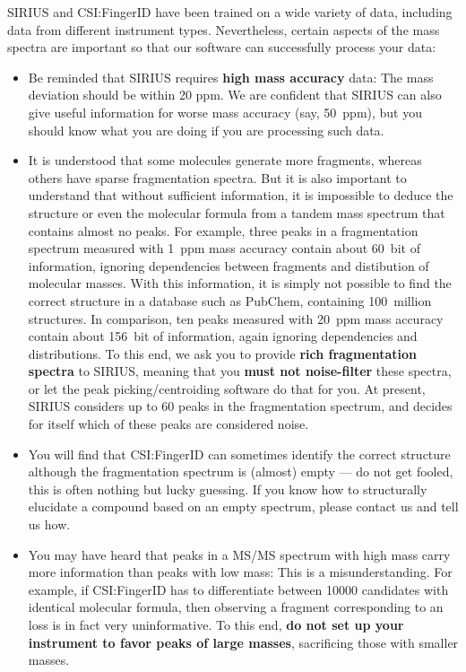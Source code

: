 \documentclass[letterpaper,10pt,openany,oneside]{sphinxmanual}
\begin{document}
SIRIUS and CSI:FingerID have been trained on a wide variety of data,
including data from different instrument types.  Nevertheless, certain
aspects of the mass spectra are important so that our software can
successfully process your data:
%
\begin{itemize}
\item Be reminded that SIRIUS requires \textbf{high mass accuracy} data:
  The mass deviation should be within 20 ppm.  We are confident that
  SIRIUS can also give useful information for worse mass accuracy (say,
  50~ppm), but you should know what you are doing if you are processing such
  data.

\item It is understood that some molecules generate more fragments, whereas
  others have sparse fragmentation spectra.  But it is also important to
  understand that without sufficient information, it is impossible to deduce
  the structure or even the molecular formula from a tandem mass spectrum
  that contains almost no peaks.  For example, three peaks in a fragmentation
  spectrum measured with 1~ppm mass accuracy contain about 60~bit of
  information, ignoring dependencies between fragments and distibution of
  molecular masses.  With this information, it is simply not possible to find
  the correct structure in a database such as PubChem, containing 100~million
  structures.  In comparison, ten peaks measured with 20~ppm mass accuracy
  contain about 156~bit of information, again ignoring dependencies and
  distributions.  To this end, we ask you to provide \textbf{rich
  fragmentation spectra} to SIRIUS, meaning that you \textbf{must not
  noise-filter} these spectra, or let the peak picking/centroiding software
  do that for you.  At present, SIRIUS considers up to 60 peaks in the
  fragmentation spectrum, and decides for itself which of these peaks are
  considered noise.

\item You will find that CSI:FingerID can sometimes identify the correct
  structure although the fragmentation spectrum is (almost) empty --- do not
  get fooled, this is often nothing but lucky guessing.  If you know how to
  structurally elucidate a compound based on an empty spectrum, please
  contact us and tell us how.

\item You may have heard that peaks in a MS/MS spectrum with high mass
  carry more information than peaks with low mass: This is a
  misunderstanding.  For example, if CSI:FingerID has to differentiate
  between 10000 candidates with identical molecular formula, then observing a
  fragment corresponding to an  loss is in fact very uninformative.
  To this end, \textbf{do not set up your instrument to favor peaks of large
  masses}, sacrificing those with smaller masses.


\end{itemize}
\end{document}
